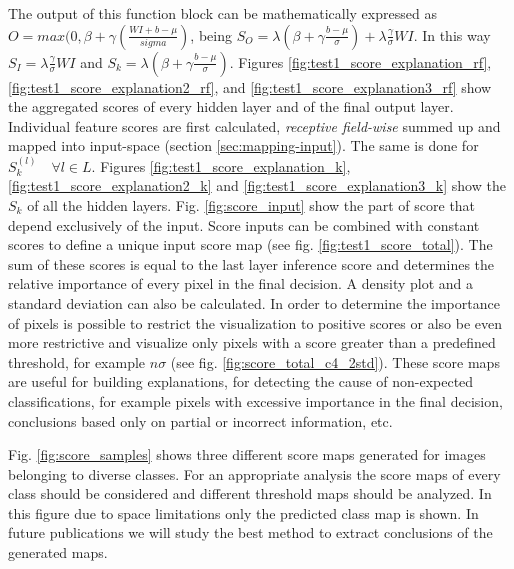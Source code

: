 \documentclass[preprint]{elsarticle}
\theoremstyle{definition} %
\theoremstyle{remark}
\begin{document}
The output of this function block can be mathematically expressed as $O = max(0, \beta + \gamma(\frac{WI + b - \mu}{sigma})$, being $S_O = \lambda (\beta + \gamma \frac{b - \mu}{\sigma}) + \lambda \frac{\gamma}{\sigma}WI$. In this way $S_I = \lambda \frac{\gamma}{\sigma}WI$ and $S_k = \lambda (\beta + \gamma \frac{b - \mu}{\sigma})$. Figures \ref{fig:test1_score_explanation_rf}, \ref{fig:test1_score_explanation2_rf}, and \ref{fig:test1_score_explanation3_rf} show the aggregated scores of every hidden layer and of the final output layer. Individual feature scores are first calculated, \emph{receptive field-wise} summed up and mapped into input-space (section \ref{sec:mapping-input}). The same is done for $S_k^{(l)} \quad \forall l \in L$. Figures \ref{fig:test1_score_explanation_k}, \ref{fig:test1_score_explanation2_k} and \ref{fig:test1_score_explanation3_k} show the $S_k$ of all the hidden layers. Fig. \ref{fig:score_input} show the part of score that depend exclusively of the input. Score inputs can be combined with constant scores to define a unique input score map (see fig. \ref{fig:test1_score_total}). The sum of these scores is equal to the last layer inference score and determines the relative importance of every pixel in the final decision. A density plot and a standard deviation can also be calculated. In order to determine the importance of pixels is possible to restrict the visualization to positive scores or also be even more restrictive and visualize only pixels with a score greater than a predefined threshold, for example $n \sigma$ (see fig. \ref{fig:score_total_c4_2std}). These score maps are useful for building explanations, for detecting the cause of non-expected classifications, for example pixels with excessive importance in the final decision, conclusions based only on partial or incorrect information, etc.

Fig. \ref{fig:score_samples} shows three different score maps generated for images belonging to diverse classes. For an appropriate analysis the score maps of every class should be considered and different threshold maps should be analyzed. In this figure due to space limitations only the predicted class map is shown. In future publications we will study the best method to extract conclusions of the generated maps.
\end{document}

